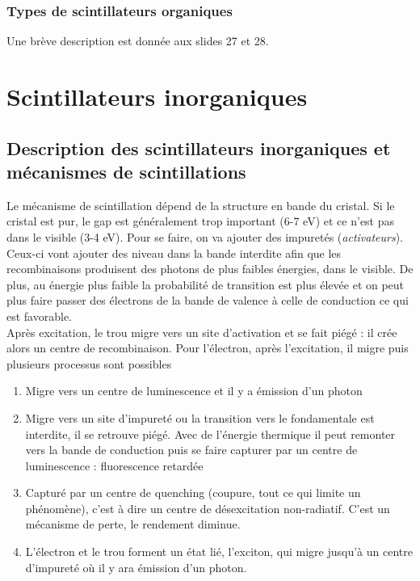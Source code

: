 \subsubsection{Types de scintillateurs organiques}
Une brève description est donnée aux slides
27 et 28.

\section{Scintillateurs inorganiques}%

\subsection{Description des scintillateurs inorganiques et mécanismes de scintillations}%
Le mécanisme de scintillation dépend de la structure en bande du cristal. Si le cristal est
pur, le gap est généralement trop important (6-7 eV) et ce n'est pas dans le visible (3-4 eV). Pour
se faire, on va ajouter des impuretés (\textit{activateurs}). Ceux-ci vont ajouter des 
niveau dans la bande interdite afin que les recombinaisons produisent des photons de plus faibles
énergies, dans le visible. De plus, au énergie plus faible la probabilité de transition est plus
élevée et on peut plus faire passer des électrons de la bande de valence à celle de conduction ce 
qui est favorable.\\

Après excitation, le trou migre vers un site d'activation et se fait piégé : il crée alors un
centre de recombinaison. Pour l'électron, après l'excitation, il migre puis plusieurs processus
sont possibles
\begin{enumerate}
\item Migre vers un centre de luminescence et il y a émission d'un photon
\item Migre vers un site d'impureté ou la transition vers le fondamentale est interdite, il se 
retrouve piégé.  Avec de l'énergie thermique il peut remonter vers la bande de conduction puis
se faire capturer par un centre de luminescence : fluorescence retardée
\item Capturé par un centre de quenching (coupure, tout ce qui limite un phénomène), c'est à dire 
un centre de désexcitation non-radiatif. C'est un mécanisme de perte, le rendement diminue.
\item L'électron et le trou forment un état lié, l'exciton, qui migre jusqu'à un centre d'impureté
où il y ara émission d'un photon.
\end{enumerate}

